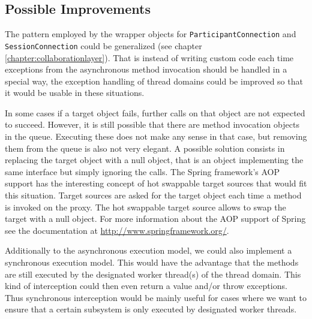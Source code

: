\subsection{Possible Improvements}
The pattern employed by the wrapper objects for \texttt{Participant\-Connection}
and \texttt{Session\-Connection} could be generalized 
(see chapter \ref{chapter:collaborationlayer}). That is instead of
writing custom code each time exceptions from the asynchronous method invocation
should be handled in a special way, the exception handling of thread domains
could be improved so that it would be usable in these situations.

In some cases if a target object fails, further calls on that object are not
expected to succeed. However, it is still possible that there are method
invocation objects in the queue. Executing these does not make any sense
in that case, but removing them from the queue is also not very elegant.
A possible solution consists in replacing the 
target object with a null object, that
is an object implementing the same interface but simply ignoring the calls.
The Spring framework's AOP support has the interesting concept of
hot swappable target sources that would fit this situation. Target sources
are asked for the target object each time a method is invoked on the
proxy. The hot swappable target source allows to swap the target with a
null object. For more information about the AOP support of Spring see
the documentation at 
\href{http://www.springframework.org/}{http://www.springframework.org/}.

Additionally to the asynchronous execution model, we could also implement
a synchronous execution model. This would have the advantage that the methods
are still executed by the designated worker thread(s) of the thread domain.
This kind of interception could then even return a value and/or throw
exceptions. Thus synchronous interception would be mainly useful for cases where
we want to ensure that a certain subsystem is only executed by designated worker
threads.
